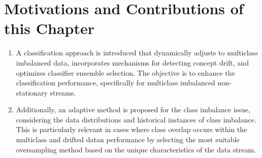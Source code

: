   
  \section{Motivations and Contributions of this Chapter} \label{sec:4_2_motivation}
  \begin{enumerate}[nosep]
    \item A classification approach is introduced that dynamically adjusts to multiclass imbalanced data, incorporates mechanisms for
    detecting concept drift, and optimizes classifier ensemble selection. The objective is to enhance the classification performance, specifically for multiclass imbalanced non-stationary streams.
   \item Additionally, an adaptive method is proposed for the class imbalance issue, considering the data distributions and historical instances of class imbalance. This is particularly relevant in cases where class overlap occurs within the multiclass and drifted datan performance by selecting the most suitable oversampling method based on the unique characteristics of the data stream. 
    \end{enumerate}